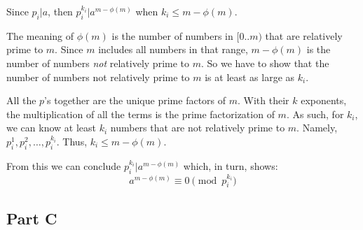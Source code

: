 \documentclass{article}
\begin{document}
Since $p_i \vert a$, then $p_i^{k_i} \vert a^{m - \phi(m)}$ when $k_i \leq m -
\phi(m)$.

\bigbreak

The meaning of $\phi(m)$ is the number of numbers in $[0..m)$ that are
relatively prime to $m$. Since $m$ includes all numbers in that range, $m -
\phi(m)$ is the number of numbers \textit{not} relatively prime to $m$. So we
have to show that the number of numbers not relatively prime to $m$ is at least
as large as $k_i$.

\bigbreak

All the $p$'s together are the unique prime factors of $m$. With their $k$
exponents, the multiplication of all the terms is the prime factorization of
$m$. As such, for $k_i$, we can know at least $k_i$ numbers that are not
relatively prime to $m$. Namely, $p_i^{1}, p_i^{2}, \ldots, p_i^{k_i}$.
Thus, $k_i \leq m - \phi(m)$.

\bigbreak

From this we can conclude $p_i^{k_i} \vert a^{m - \phi(m)}$ which, in turn,
shows:
$$ a^{m - \phi(m)} \equiv 0 \pmod{p_i^{k_i}} $$

\break

\subsection*{Part C}
\end{document}
